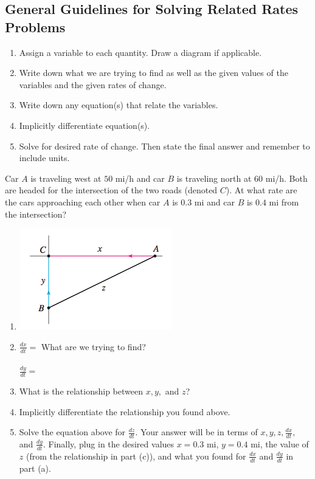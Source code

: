 \documentclass[12pt, a4paper]{article}
\begin{document}
\subsection*{General Guidelines for Solving Related Rates Problems}
\begin{enumerate}
\item Assign a variable to each quantity. Draw a diagram if applicable.
\item Write down what we are trying to find as well as the given values of the variables and the given rates of change. 
\item Write down any equation(s) that relate the variables. 
\item Implicitly differentiate equation(s).
\item Solve for desired rate of change. Then state the final answer and remember to include units. 
\end{enumerate}
\begin{ex}
  Car \(A\) is traveling west at \(50\) mi/h and car \(B\) is
  traveling north at \(60\) mi/h. Both are headed for the intersection
  of the two roads (denoted \(C\)). At what rate are the cars
  approaching each other 
  when car \(A\) is \(0.3\) mi and car \(B\) is \(0.4\) mi from the
  intersection? 
\end{ex}
\vspace{-2in}
\begin{enumerate}
\item \includegraphics[scale=0.5]{images/cars-at-intersection}

\item   \(\frac{dx}{dt} = \) \hspace{2in} What are we trying to find?
  \\ \\
   \(\frac{dy}{dt} = \)
\item What is the relationship
  between \(x,y,\) and \(z\)?
  \vspace{1in}
\item Implicitly differentiate the relationship you found above.
  \vspace{1in}
\item Solve the equation above for \(\frac{dz}{dt}\). Your answer will
  be in terms of \(x,y,z,\frac{dx}{dt},\) and
  \(\frac{dy}{dt}\). Finally, plug in the desired values \(x=0.3\) mi,
  \(y = 0.4\) mi, the value of \(z\) (from the
  relationship in part (c)), and what you found for \(\frac{dx}{dt}\) and
  \(\frac{dy}{dt}\) in part (a).
\end{enumerate} \vspace{1in}
\end{document}

